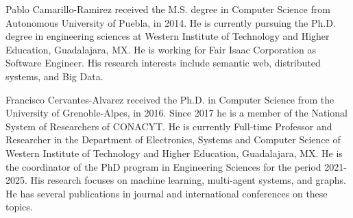 \documentclass{ieeeaccess}
\begin{document}
 


\begin{IEEEbiography}{Pablo Camarillo-Ramirez} received the M.S.
degree in Computer Science from Autonomous University of Puebla, 
in 2014. He is currently pursuing the Ph.D. degree in engineering
sciences at Western Institute of Technology and Higher Education,
Guadalajara, MX. He is working for Fair Isaac Corporation as Software Engineer. His
research interests include semantic web, distributed systems,
and Big Data.
\end{IEEEbiography}

\begin{IEEEbiography}
{Francisco Cervantes-Alvarez} received
the Ph.D. in Computer Science from the University of Grenoble-Alpes,
in 2016. Since 2017 he is a member of the National System of 
Researchers of CONACYT. He is currently Full-time Professor and 
Researcher in the Department of Electronics, Systems and Computer 
Science of Western Institute of Technology and Higher Education,
Guadalajara, MX. He is the coordinator of the PhD program in 
Engineering Sciences for the period 2021-2025. His research focuses
on machine learning, multi-agent systems, and graphs. He has several
publications in journal and international conferences on these
topics.
\end{IEEEbiography}
\end{document}
